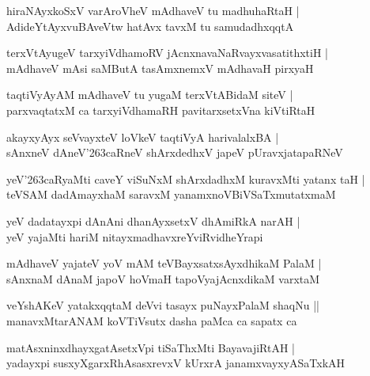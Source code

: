\documentclass[twoside,12pt,openright]{book}
\def\S{\char'263}
\newcounter{shloka}[chapter]
\begin{document}
\begin{shloka}%
hiraNAyxkoSxV varAroVheV mAdhaveV tu madhuhaRtaH |\\
AdideYtAyxvuBAveVtw hatAvx tavxM tu samudadhxqqtA
\end{shloka}

\begin{shloka}%
terxVtAyugeV tarxyiVdhamoRV jAcnxnavaNaRvayxvasatithxtiH |\\
mAdhaveV mAsi saMButA tasAmxnemxV mAdhavaH pirxyaH 
\end{shloka}

\begin{shloka}%
taqtiVyAyAM mAdhaveV tu yugaM terxVtABidaM siteV |\\
parxvaqtatxM ca tarxyiVdhamaRH pavitarxsetxVna kiVtiRtaH 
\end{shloka}

\begin{shloka}%
akayxyAyx seVvayxteV loVkeV taqtiVyA harivalalxBA |\\
sAnxneV dAneV\S caRneV shArxdedhxV japeV pUravxjatapaRNeV 
\end{shloka}

\begin{shloka}%
yeV\S caRyaMti caveY viSuNxM shArxdadhxM kuravxMti yatanx taH |\\
teVSAM dadAmayxhaM saravxM yanamxnoVBiVSaTxmutatxmaM  
\end{shloka}

\begin{shloka}%
yeV dadatayxpi dAnAni dhanAyxsetxV dhAmiRkA narAH |\\
yeV yajaMti hariM nitayxmadhavxreYviRvidheYrapi 
\end{shloka}

\begin{shloka}%
mAdhaveV yajateV yoV mAM teVBayxsatxsAyxdhikaM PalaM |\\
sAnxnaM dAnaM japoV hoVmaH tapoVyajAcnxdikaM varxtaM 
\end{shloka}

\begin{shloka}%
veYshAKeV yatakxqqtaM deVvi tasayx puNayxPalaM shaqNu ||\\
manavxMtarANAM koVTiVsutx dasha paMca ca sapatx ca 
\end{shloka}

\begin{shloka}%
matAsxninxdhayxgatAsetxVpi tiSaThxMti BayavajiRtAH |\\
yadayxpi susxyXgarxRhAsasxrevxV kUrxrA janamxvayxyASaTxkAH 
\end{shloka}
\end{document}
